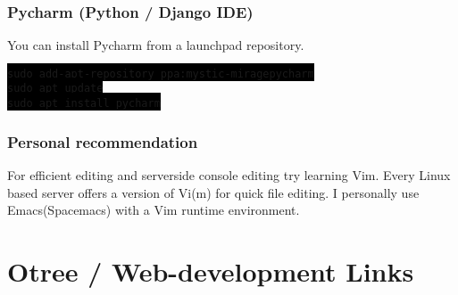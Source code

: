 \documentclass[11pt]{article}
\newcommand{\lincode}[1]{\colorbox{black}{\footnotesize\color{green}\tt #1}}
\begin{document}
\subsubsection{Pycharm (Python / Django IDE)}
\label{sec:orgheadline25}

You can install Pycharm from a launchpad repository.

\lincode{sudo add-apt-repository ppa:mystic-mirage\/pycharm}\\
\lincode{sudo apt update}\\
\lincode{sudo apt install pycharm}\\

\subsubsection{Personal recommendation}
\label{sec:orgheadline26}

For efficient editing and serverside console editing try learning Vim. Every Linux based server offers a version of Vi(m) for quick file editing. I personally use Emacs(Spacemacs) with a Vim runtime environment.

\section{Otree / Web-development Links}
\label{sec:orgheadline29}
\end{document}
